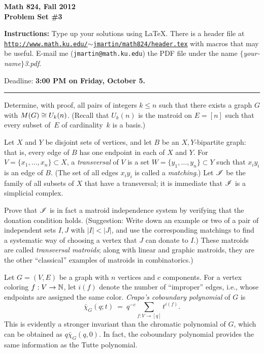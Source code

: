 

\bf Math 824, Fall 2012\\
Problem Set \#3\rm

{\bf Instructions:} Type up your solutions using LaTeX.  There is a
header file at\\
\href{http://www.jlmartin.faculty.ku.edu/math824/header.tex}{\tt http://www.math.ku.edu/$\sim$jmartin/math824/header.tex} with macros that may be useful.
E-mail me (\texttt{jmartin@math.ku.edu}) the PDF file under the name \textsl{$\{$your-name$\}$3.pdf}.

Deadline: {\bf 3:00 PM on Friday, October 5.}
\smallskip\hrule


\prob Determine, with proof, all pairs of integers $k\leq n$ such
that there exists a graph $G$ with $M(G)\cong U_k(n)$.  (Recall
that $U_k(n)$ is the matroid on $E=[n]$ such that every
subset of~$E$ of cardinality~$k$ is a basis.)

\prob Let $X$ and $Y$ be disjoint sets of vertices, and let $B$ be an $X,Y$-bipartite
graph: that is, every edge of $B$ has one endpoint in each of $X$ and $Y$.
For $V=\{x_1,\dots,x_n\}\subset X$, a \emph{transversal} of $V$ is a set $W=\{y_1,\dots,y_n\}\subset Y$
such that $x_iy_i$ is an edge of $B$.  (The set of all edges $x_iy_i$ is called a \emph{matching}.)
Let $\mathscr{I}$ be the family of all subsets of $X$
that have a transversal; it is immediate that $\mathscr{I}$ is a simplicial complex.

Prove that $\mathscr{I}$ is in fact a matroid independence system by verifying that the donation condition
holds.  (Suggestion: Write down an example
or two of a pair of independent sets $I,J$ with $|I|<|J|$, and use the corresponding matchings
to find a systematic way of choosing a vertex that $J$ can donate to $I$.)
These matroids are called \emph{transversal matroids}; along with linear and graphic matroids,
they are the other ``classical'' examples of matroids in combinatorics.)

\prob Let $G=(V,E)$ be a graph with $n$ vertices and $c$ components.
For a vertex coloring $f:V\to\mathbb{N}$, let $i(f)$ denote the number of ``improper'' edges,
i.e., whose endpoints are assigned the same color.
\emph{Crapo's coboundary polynomial} of $G$ is
  $$\bar\chi_G(q;t) ~=~ q^{-c}\sum_{f:V\to[q]} t^{i(f)}.$$
This is evidently a stronger invariant than the chromatic polynomial of $G$, which can be obtained as $q\bar\chi_G(q,0)$.
In fact, the coboundary polynomial provides the same information as the Tutte polynomial.

